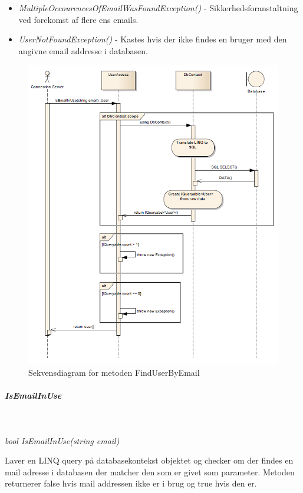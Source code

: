 \begin{itemize}
	\item \textit{MultipleOccourencesOfEmailWasFoundException()} - Sikkerhedsforanstaltning ved forekomst af flere ens emails.
	\item \textit{UserNotFoundException()} - Kastes hvis der ikke findes en bruger med den angivne email addresse i databasen.
\end{itemize}

\begin{figure}[h]
\centering
\includegraphics[width=\linewidth]{figs/dbSeq/findUserByEmail.PNG}
\caption{Sekvensdiagram for metoden FindUserByEmail}
\label{fig:findUserByEmail}
\end{figure}


\subparagraph{IsEmailInUse}\

\textit{bool IsEmailInUse(string email)}

Laver en LINQ query på databasekontekst objektet og checker om der findes en mail adresse i databasen der matcher den som er givet som parameter. Metoden returnerer false hvis mail addressen ikke er i brug og true hvis den er.

